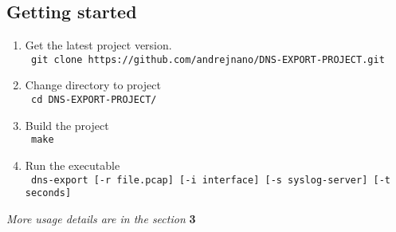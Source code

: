 \subsection{Getting started}

\begin{enumerate}
\item Get the latest project version.\\
\texttt{ git clone https://github.com/andrejnano/DNS-EXPORT-PROJECT.git}
\item Change directory to project \\
\texttt{ cd DNS-EXPORT-PROJECT/ }
\item Build the project \\
\texttt{ make }
\item Run the executable \\
\texttt{ dns-export [-r file.pcap] [-i interface] [-s syslog-server] [-t seconds]}
\end{enumerate}

\quad \quad \textit{More usage details are in the section} \textbf{3}